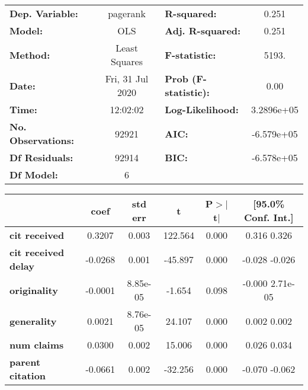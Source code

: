 \begin{center}
\begin{tabular}{lclc}
\toprule
\textbf{Dep. Variable:}     &     pagerank     & \textbf{  R-squared:         } &       0.251     \\
\textbf{Model:}             &       OLS        & \textbf{  Adj. R-squared:    } &       0.251     \\
\textbf{Method:}            &  Least Squares   & \textbf{  F-statistic:       } &       5193.     \\
\textbf{Date:}              & Fri, 31 Jul 2020 & \textbf{  Prob (F-statistic):} &       0.00      \\
\textbf{Time:}              &     12:02:02     & \textbf{  Log-Likelihood:    } &   3.2896e+05    \\
\textbf{No. Observations:}  &       92921      & \textbf{  AIC:               } &   -6.579e+05    \\
\textbf{Df Residuals:}      &       92914      & \textbf{  BIC:               } &   -6.578e+05    \\
\textbf{Df Model:}          &           6      & \textbf{                     } &                 \\
\bottomrule
\end{tabular}
\begin{tabular}{lccccc}
                            & \textbf{coef} & \textbf{std err} & \textbf{t} & \textbf{P$>$$|$t$|$} & \textbf{[95.0\% Conf. Int.]}  \\
\midrule
\textbf{cit received}       &       0.3207  &        0.003     &   122.564  &         0.000        &         0.316     0.326       \\
\textbf{cit received delay} &      -0.0268  &        0.001     &   -45.897  &         0.000        &        -0.028    -0.026       \\
\textbf{originality}        &      -0.0001  &     8.85e-05     &    -1.654  &         0.098        &        -0.000  2.71e-05       \\
\textbf{generality}         &       0.0021  &     8.76e-05     &    24.107  &         0.000        &         0.002     0.002       \\
\textbf{num claims}         &       0.0300  &        0.002     &    15.006  &         0.000        &         0.026     0.034       \\
\textbf{parent citation}    &      -0.0661  &        0.002     &   -32.256  &         0.000        &        -0.070    -0.062       \\

\end{tabular}
\end{center}

